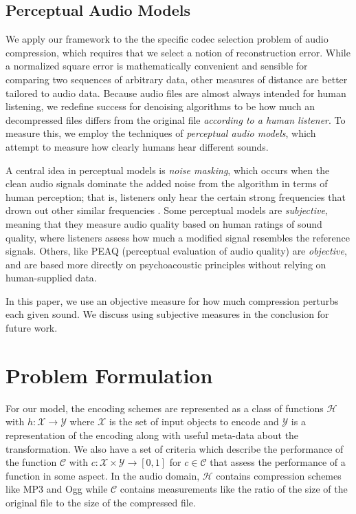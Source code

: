 \documentclass{article}
\begin{document}
{\subsection{Perceptual Audio Models}\label{perceptual}
We apply our framework to the the specific codec selection problem of audio compression, which requires that we select a notion of reconstruction error. While a normalized square error is mathematically convenient and sensible for comparing two sequences of arbitrary data, other measures of distance are better tailored to audio data. Because audio files are almost always intended for human listening, we redefine success for denoising algorithms to be how much an decompressed files differs from the original file \textit{according to a human listener}. To measure this, we employ the techniques of \textit{perceptual audio models}, which attempt to measure how clearly humans hear different sounds.

A central idea in perceptual models is \textit{noise masking}, which occurs when the clean audio signals dominate the added noise from the algorithm in terms of human perception; that is, listeners only hear the certain strong frequencies that drown out other similar frequencies \citep{jayant}. Some perceptual models are \textit{subjective}, meaning that they measure audio quality based on human ratings of sound quality, where listeners assess how much a modified signal resembles the reference signals. Others, like PEAQ (perceptual evaluation of audio quality) are \textit{objective}, and are based more directly on psychoacoustic principles without relying on human-supplied data\citep{thiede}.

In this paper, we use an objective measure for how much compression perturbs each given sound. We discuss using subjective measures in the conclusion for future work.

\section{Problem Formulation}

For our model, the encoding schemes are represented as a class of functions $\mathcal{H}$ with $h: \mathcal{X} \rightarrow \mathcal{Y}$ where $\mathcal{X}$ is the set of input objects to encode and $\mathcal{Y}$ is a representation of the encoding along with useful meta-data about the transformation. We also have a set of criteria which describe the performance of the function $\mathcal{C}$ with $c: \mathcal{X} \times \mathcal{Y} \rightarrow [0,1]$ for $c \in \mathcal{C}$ that assess the performance of a function in some aspect. In the audio domain, $\mathcal{H}$ contains compression schemes like MP3 and Ogg while $\mathcal{C}$ contains measurements like the ratio of the size of the original file to the size of the compressed file. 

}
\end{document}
